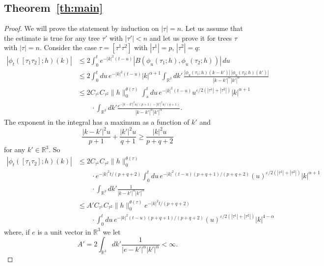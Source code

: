\documentclass[a4paper,12pt,reqno]{amsart}
\newcommand{\1}{{\bf 1}}
\newcommand{\eps}{\varepsilon}
\newcommand{\RR}{\mathbb{R}}
\begin{document}
\subsection{Theorem~\ref{th:main}}
\begin{proof}
We will prove the statement by induction on $|\tau|= n$. Let us
assume that the estimate is true for any tree $\tau'$ with $|\tau'| <
n$ and let us prove it for trees $\tau$ with $|\tau| = n$. 
Consider the case $\tau = [\tau^1 \tau^2]$ with $|\tau^1| = p$,
$|\tau^2| = q$:
\begin{equation*}
  \begin{split}
\left|\phi_{t}([\tau_1 \tau_2];h)(k)\right|
&  \le 2 \int_0^t e^{-|k|^2 (t-u)} 
|B(\phi_{u}(\tau_1;h), \phi_{u}(\tau_2;h))|\,du    
\\
&  \le 2 \int_0^t du\,e^{-|k|^2 (t-u)} 
 |k|^{\alpha+1}
\int_{\RR^3}dk'\, \frac{|\phi_{u}(\tau_1;h)(k-k')|\, |\phi_{u}(\tau_2;h)(k')|}{|k-k'|^{\alpha} |k'|^{\alpha}}    
\\
&  \le 2 C_{\tau^1} C_{\tau^2} \|h\|_0^{\theta(\tau)}
\int_s^t du\, e^{-|k|^2 (t-u)} u^{\eps/2 (|\tau^1|+|\tau^2|)}
 |k|^{\alpha+1}
\\ & \qquad \cdot
\int_{\RR^3}dk' \frac{e^{-|k-k'|^2 u / (p+1)-|k'|^2 u / (q+1)}}{|k-k'|^{\alpha} |k'|^{\alpha}}.    
  \end{split}
\end{equation*}
The exponent in the integral has a maximum as a function of $k'$ and
$$
\frac{|k-k'|^2 u}{p+1} + \frac{|k'|^2 u}{q+1}  \ge \frac{|k|^2 u}{p+q+2} 
$$
for any $k' \in \RR^3$. So
\begin{equation}
\label{eq:this}
  \begin{split}
\left|\phi_{t}([\tau_1 \tau_2];h)(k)\right|
&   \le 2 C_{\tau^1} C_{\tau^2} \|h\|_0^{\theta(\tau)}
\\ & \qquad \cdot
e^{-|k|^2 t/(p+q+2)} \int_0^t du\, e^{-|k|^2 (t-u) (p+q+1)/(p+q+2)}  
 (u)^{\eps/2 (|\tau^1|+|\tau^2|)} |k|^{\alpha+1}
\\ & \qquad \cdot
\int_{\RR^3}dk' \frac{1}{|k-k'|^{\alpha} |k'|^{\alpha}}   
\\ &   \le A' C_{\tau^1} C_{\tau^2} \|h\|_0^{\theta(\tau)}
e^{-|k|^2 t/(p+q+2)}
\\ & \qquad \cdot
 \int_0^t du\, e^{-|k|^2 (t-u) (p+q+1)/(p+q+2)}  
(u)^{\eps/2 (|\tau^1|+|\tau^2|)}
 |k|^{4-\alpha}
  \end{split}
\end{equation}
where, if $e$ is a unit vector in $\RR^3$ we let
$$
A' = 2\int_{\RR^3}dk' \frac{1}{|e-k'|^{\alpha} |k'|^{\alpha}} < \infty.   
$$
\end{proof}
\end{document}

